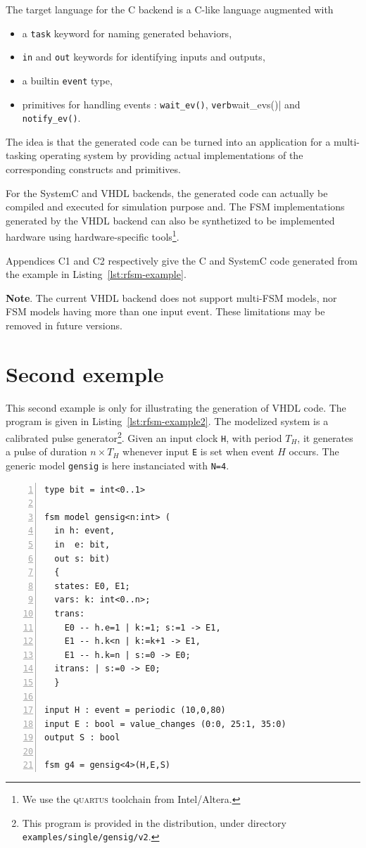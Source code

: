 \medskip
The target language for the C backend is a C-like language augmented with
\begin{itemize}
\item a \verb|task| keyword for naming generated behaviors,
\item \verb|in| and \verb|out| keywords for identifying inputs and outputs,
\item a builtin \verb|event| type,
\item primitives for handling events : \verb|wait_ev()|, \verb|verb|wait_evs()| and
  \verb|notify_ev()|. 
\end{itemize}
The idea is that the generated code can be turned into an application for a multi-tasking operating
system by providing actual implementations of the corresponding constructs and primitives.

\medskip
For the SystemC and VHDL backends, the generated code can actually be compiled and executed for
simulation purpose and. The FSM implementations generated by the VHDL backend can also be
synthetized to be implemented hardware using hardware-specific tools\footnote{We use the
  \textsc{quartus} toolchain from Intel/Altera.}. 

\medskip
Appendices C1 and C2 respectively give the C and SystemC code generated from the example in
Listing~\ref{lst:rfsm-example}. 

\medskip
\textbf{Note}. The current VHDL backend does not support multi-FSM models, nor FSM models having
more than one input event. These limitations may be removed in future versions.

\section{Second exemple}
\label{sec:second-example}

This second example is only for illustrating the generation of VHDL code.  The program is given in
Listing~\ref{lst:rfsm-example2}. The modelized system is a calibrated pulse generator\footnote{This
  program is provided in the distribution, under directory
  \texttt{examples/single/gensig/v2}.}. Given an input clock \verb|H|, with period $T_H$, it
generates a pulse of duration $n \times T_H$ whenever input \texttt{E} is set when event $H$
occurs. The generic model \verb|gensig| is here instanciated with \verb|N=4|.

\begin{lstlisting}[language=Rfsm,frame=single,numbers=left,caption=Another RFSM program,label={lst:rfsm-example2},float]
type bit = int<0..1>
  
fsm model gensig<n:int> (
  in h: event,
  in  e: bit,
  out s: bit)
  {
  states: E0, E1;
  vars: k: int<0..n>;
  trans: 
    E0 -- h.e=1 | k:=1; s:=1 -> E1,
    E1 -- h.k<n | k:=k+1 -> E1,
    E1 -- h.k=n | s:=0 -> E0;
  itrans: | s:=0 -> E0;
  }

input H : event = periodic (10,0,80)
input E : bool = value_changes (0:0, 25:1, 35:0)
output S : bool 

fsm g4 = gensig<4>(H,E,S)
\end{lstlisting}

